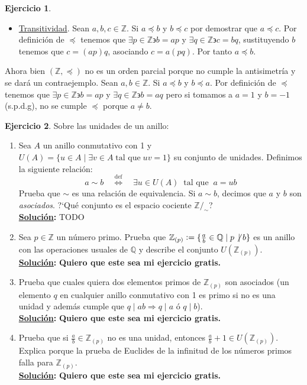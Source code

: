 \documentclass[11pt,letterpaper]{article}
\theoremstyle{definition}\newtheorem{p}{Ejercicio}
\theoremstyle{definition}\newtheorem{pp}[p]{$(*)$Ejercicio}
\numberwithin{p}{section}
\newcommand{\Z}{\mathbb{Z}}
\newcommand{\Q}{\mathbb{Q}}
\newcommand{\ent}{\Longrightarrow}
\newcommand{\sii}{\Longleftrightarrow}
\newcommand{\sol}{\textbf{\underline{Solución}: }} %
\begin{document}
\begin{p}
\begin{itemize}
    \item \underline{Transitividad}. Sean $a, b, c \in \Z$. Si $a \preccurlyeq b$ y $b \preccurlyeq c$ 
      por demostrar que $a \preccurlyeq c$.
      Por definición de $\preccurlyeq$ tenemos que $\exists p \in \Z \backepsilon b=ap$ y 
      $\exists q \in \Z \backepsilon c=bq$, sustituyendo $b$ tenemos que $c=(ap)q$, asociando
      $c=a(pq)$. Por tanto $a \preccurlyeq b$.      
  \end{itemize}
    
    Ahora bien $(\Z, \preccurlyeq)$ no es un orden parcial porque no cumple la antisimetría y 
    se dará un contraejemplo.
    Sean $a, b \in \Z$. Si $a \preccurlyeq b$ y $b \preccurlyeq a$. Por definición de $\preccurlyeq$ 
    tenemos que $\exists p \in \Z \backepsilon b=ap$ y $\exists q \in \Z \backepsilon b=aq$ pero si 
    tomamos a $a=1$ y $b=-1$ (s.p.d.g), no se cumple $\preccurlyeq$ porque $a \neq b$.
\end{p}

\begin{p} Sobre las unidades de un anillo:
  \begin{enumerate}
  \item Sea $A$ un anillo conmutativo con 1 y
    $U(A)=\{u\in A\mid \exists v\in A\;\text{tal que}\; uv=1\}$ su conjunto de unidades. Definimos la
    siguiente relaci\'on:
    \[
      a\sim b \quad\stackrel{\text{def}}{\sii}\quad \exists u\in U(A)\;\;\text{tal que}\;\; a=ub
    \]
    Prueba que $\sim$ es una relaci\'on de equivalencia. Si $a\sim b$, decimos que $a$ y $b$ son
    \emph{asociados}. ?`Qu\'e conjunto es el espacio cociente $\Z/_{\sim}$?\\
    \sol TODO
    
  \item Sea $p\in\Z$ un n\'umero primo. Prueba que $\Z_{(p)}:=\{\frac{a}{b}\in\Q\mid p\not\,\mid b\}$
    es un anillo con las operaciones usuales de $\Q$ y describe el conjunto $U(\Z_{(p)})$.\\
  \sol \textbf{Quiero que este sea mi ejercicio gratis.}
    
  \item Prueba que cuales quiera dos elementos primos de $\Z_{(p)}$ son asociados (un elemento
    $q$ en cualquier anillo conmutativo con 1 es primo si no es una unidad y adem\'as cumple
    que $q\mid ab \ent q\mid a$ \'o $q\mid b$).\\
  \sol \textbf{Quiero que este sea mi ejercicio gratis.}
  
  \item Prueba que si $\frac{a}{b}\in\Z_{(p)}$ no es una unidad, entonces
    $\frac{a}{b}+1\in U(\Z_{(p)})$. Explica porque la prueba de Euclides de la infinitud de los
    n\'umeros primos falla para $\Z_{(p)}$.\\
  \sol \textbf{Quiero que este sea mi ejercicio gratis.}
  
  \end{enumerate}
  
\end{p}
\end{document}

